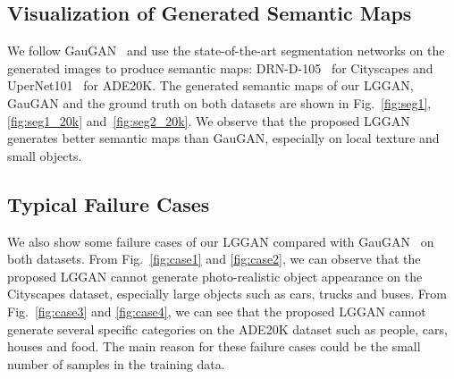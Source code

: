 \documentclass[10pt,twocolumn,letterpaper]{article}
\begin{document}
\subsection{Visualization of Generated Semantic Maps}
\label{sec:6}
We follow GauGAN~\cite{park2019semantic} and use
the state-of-the-art segmentation networks on the generated images to produce semantic maps:
DRN-D-105~\cite{yu2017dilated} for  Cityscapes and UperNet101~\cite{xiao2018unified} for ADE20K. 
The generated semantic maps of our LGGAN, GauGAN and the ground truth on both datasets are shown in Fig.~\ref{fig:seg1}, \ref{fig:seg1_20k} and~\ref{fig:seg2_20k}.
We observe that the proposed LGGAN
generates better semantic maps than GauGAN, especially
on local texture and small objects.

\subsection{Typical Failure Cases}
\label{sec:7}
We also show some failure cases of our LGGAN compared with GauGAN~\cite{park2019semantic} on both datasets.
From Fig.~\ref{fig:case1} and \ref{fig:case2}, we can observe that the proposed LGGAN cannot generate photo-realistic object appearance on the Cityscapes dataset, especially large objects such as cars, trucks and buses.
From Fig.~\ref{fig:case3} and \ref{fig:case4}, we can see that the proposed LGGAN cannot generate several specific categories on the ADE20K dataset such as people, cars, houses and food.
The main reason for these failure cases could be the small number of samples in the training data.
\end{document}
